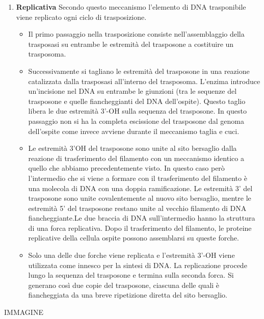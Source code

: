 \documentclass[]{article}
\begin{document}
\begin{enumerate}
\def\labelenumi{\arabic{enumi}.}
\setcounter{enumi}{1}
\itemsep1pt\parskip0pt
\item
  \textbf{Replicativa} Secondo questo meccanismo l'elemento di DNA
  trasponibile viene replicato ogni ciclo di trasposizione.

  \begin{itemize}
  \itemsep1pt\parskip0pt
  \item
    Il primo passaggio nella trasposizione consiste nell'assemblaggio
    della trasposasi su entrambe le estremità del trasposone a
    costituire un trasposoma.
  \item
    Successivamente si tagliano le estremità del trasposone in una
    reazione catalizzata dalla trasposasi all'interno del trasposoma.
    L'enzima introduce un'incisione nel DNA su entrambe le giunzioni
    (tra le sequenze del trasposone e quelle fiancheggianti del DNA
    dell'ospite). Questo taglio libera le due estremità 3'-OH sulla
    sequenza del trasposone. In questo passaggio non si ha la completa
    escissione del trasposone dal genoma dell'ospite come invece avviene
    durante il meccanismo taglia e cuci.
  \item
    Le estremità 3'OH del trasposone sono unite al sito bersaglio dalla
    reazione di trasferimento del filamento con un meccanismo identico a
    quello che abbiamo precedentemente visto. In questo caso però
    l'intermedio che si viene a formare con il trasferimento del
    filamento è una molecola di DNA con una doppia ramificazione. Le
    estremità 3' del trasposone sono unite covalentemente al nuovo sito
    bersaglio, mentre le estremità 5' del trasposone restano unite al
    vecchio filamento di DNA fiancheggiante.Le due braccia di DNA
    sull'intermedio hanno la struttura di una forca replicativa. Dopo il
    trasferimento del filamento, le proteine replicative della cellula
    ospite possono assemblarsi su queste forche.
  \item
    Solo una delle due forche viene replicata e l'estremità 3'-OH viene
    utilizzata come innesco per la sintesi di DNA. La replicazione
    procede lungo la sequenza del trasposone e termina sulla seconda
    forca. Si generano così due copie del trasposone, ciascuna delle
    quali è fiancheggiata da una breve ripetizione diretta del sito
    bersaglio.
  \end{itemize}
\end{enumerate}

IMMAGINE
\end{document}
